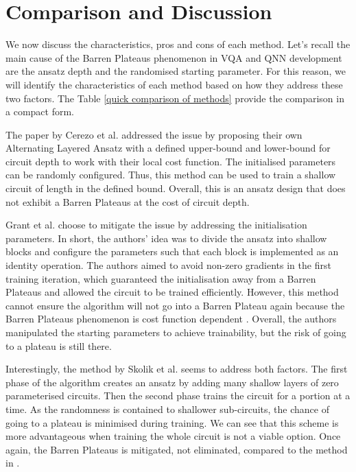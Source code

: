 \section{Comparison and Discussion}
We now discuss the characteristics, pros and cons of each method.
Let's recall the main cause of the Barren Plateaus phenomenon in VQA and QNN development are the ansatz depth and the randomised starting parameter.
For this reason, we will identify the characteristics of each method based on how they address these two factors.
The Table \ref{quick comparison of methods} provide the comparison in a compact form.

The paper \cite{cerezoCostFunctionDependent2021} by Cerezo et al. addressed the issue by proposing their own Alternating Layered Ansatz with a defined upper-bound and lower-bound for circuit depth to work with their local cost function. 
The initialised parameters can be randomly configured.
Thus, this method can be used to train a shallow circuit of length in the defined bound. 
Overall, this is an ansatz design that does not exhibit a Barren Plateaus at the cost of circuit depth.

Grant et al. \cite{grantInitializationStrategyAddressing2019} choose to mitigate the issue by addressing the initialisation parameters. 
In short, the authors' idea was to divide the ansatz into shallow blocks and configure the parameters such that each block is implemented as an identity operation.
The authors aimed to avoid non-zero gradients in the first training iteration, which guaranteed the initialisation away from a Barren Plateaus and allowed the circuit to be trained efficiently.
However, this method cannot ensure the algorithm will not go into a Barren Plateau again because the Barren Plateaus phenomenon is cost function dependent \cite{cerezoCostFunctionDependent2021}.
Overall, the authors manipulated the starting parameters to achieve trainability, but the risk of going to a plateau is still there.

Interestingly, the method by Skolik et al. \cite{skolikLayerwiseLearningQuantum2021} seems to address both factors.
The first phase of the algorithm creates an ansatz by adding many shallow layers of zero parameterised circuits. 
Then the second phase trains the circuit for a portion at a time.
As the randomness is contained to shallower sub-circuits, the chance of going to a plateau is minimised during training.
We can see that this scheme is more advantageous when training the whole circuit is not a viable option. 
Once again, the Barren Plateaus is mitigated, not eliminated, compared to the method in \cite{cerezoCostFunctionDependent2021}.

